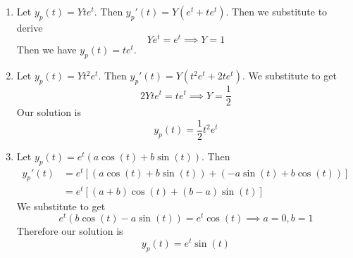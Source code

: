 \documentclass[a4paper]{article}
\begin{document}

\begin{enumerate}[label=(\alph*)]
	\item Let \( y_{p } \!\left( t  \right) = Yte^{t } \). Then \( y_{p }'\!\left( t  \right) = Y \!\left( e^{t } + te^{t } \right) \). Then we substitute to derive
	\[
		Ye^{t } = e^{t } \implies Y = 1 
	\]
	Then we have \( y_{p } \!\left( t  \right) = te^{t } \).
	\item Let \( y_{p } \!\left( t  \right) = Yt^{2}e^{t } \). Then \( y_{p }'\!\left( t  \right) = Y \!\left( t^{2}e^{t } + 2te^{t } \right) \). We substitute to get
	\[
		2Yte^{t } = te^{t } \implies Y = \frac{1}{2} 
	\]
	Our solution is
	\[
		y_{p } \!\left( t  \right) = \frac{1}{2}t^{2}e^{t }
	\]
	\item Let \( y_{p }\!\left( t  \right) = e^{t } \!\left( a \cos\!\left(t \right) + b \sin\!\left(t \right)  \right) \). Then 
	\begin{align*}
		y_{p}'\!\left( t \right) & = e^{t}\!\left[ \!\left( a \cos\!\left(t \right) + b \sin\!\left(t \right)  \right) + \!\left( -a \sin\!\left(t \right) + b \cos\!\left(t \right)  \right) \right] \\
					 & = e^{t } \!\left[ \!\left( a + b  \right)\cos\!\left(t \right) + \!\left( b - a  \right) \sin\!\left(t \right)  \right]
	\end{align*}
	We substitute to get
	\[
		e^{t } \!\left( b \cos\!\left(t \right) - a \sin\!\left(t \right)  \right) = e^{t } \cos\!\left(t \right)  \implies a = 0, b = 1
	\]
	Therefore our solution is
	\[
		y_{p }\!\left( t  \right) = e^{t }\sin\!\left(t\right)  
	\]
\end{enumerate}

\end{document}
